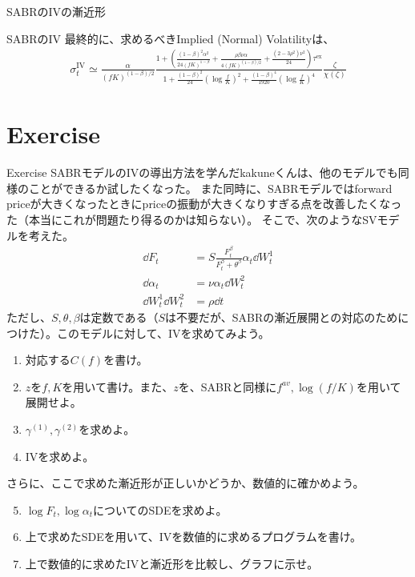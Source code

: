 \documentclass[dvipdfmx,9pt]{beamer}
\begin{document}
\begin{frame}{SABRのIVの漸近形}
  \begin{block}{SABRのIV}
    最終的に、求めるべきImplied (Normal) Volatilityは、
    \begin{align}
      \sigma_{t}^{\mathrm{IV}} \simeq
      \frac{\alpha}{(fK)^{(1-\beta)/2}}
      \frac{1 + \left( \frac{(1-\beta)^{2}\alpha^{2}}{24(fK)^{1-\beta}}
        + \frac{\rho\beta\nu\alpha}{4(fK)^{(1-\beta)/2}}
        + \frac{(2-3\rho^{2})\nu^{2}}{24}\right)\tau^{\mathrm{ex}}}{1 + \frac{(1-\beta)^{2}}{24}
        \left(\log \frac{f}{K}\right)^{2}
        + \frac{(1-\beta)^{4}}{1920}\left(\log \frac{f}{K}\right)^{4}}
      \frac{\zeta}{\chi(\zeta)}
    \end{align}
  \end{block}
\end{frame}


\section{Exercise}
\begin{frame}{Exercise}
  SABRモデルのIVの導出方法を学んだkakuneくんは、他のモデルでも同様のことができるか試したくなった。
  また同時に、SABRモデルではforward priceが大きくなったときにpriceの振動が大きくなりすぎる点を改善したくなった（本当にこれが問題たり得るのかは知らない）。
  そこで、次のようなSVモデルを考えた。
  \begin{align}
    \dd F_{t}                   & = S\frac{F_{t}^{\beta}}{F_{t}^{\beta} + \theta^{\beta}} \alpha_{t} \dd W_{t}^{1} \\
    \dd \alpha_{t}              & = \nu \alpha_{t} \dd W_{t}^{2}                                                   \\
    \dd W_{t}^{1} \dd W_{t}^{2} & = \rho \dd t
  \end{align}
  ただし、$S,\theta,\beta$は定数である（$S$は不要だが、SABRの漸近展開との対応のためにつけた）。このモデルに対して、IVを求めてみよう。
  \begin{enumerate}
    \item 対応する$C(f)$を書け。
    \item $z$を$f,K$を用いて書け。また、$z$を、SABRと同様に$f^{av},\log (f/K)$を用いて展開せよ。
    \item $\gamma^{(1)},\gamma^{(2)}$を求めよ。
    \item IVを求めよ。
  \end{enumerate}
  さらに、ここで求めた漸近形が正しいかどうか、数値的に確かめよう。
  \begin{enumerate}
    \setcounter{enumi}{4}
    \item $\log F_{t} , \log \alpha_{t}$についてのSDEを求めよ。
    \item 上で求めたSDEを用いて、IVを数値的に求めるプログラムを書け。
    \item 上で数値的に求めたIVと漸近形を比較し、グラフに示せ。
  \end{enumerate}

\end{frame}
\end{document}
